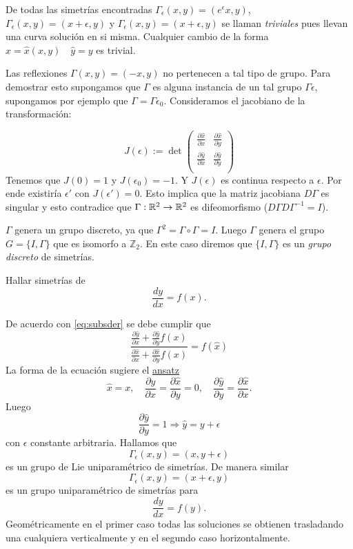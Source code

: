  De todas las simetrías encontradas $\Gamma_{\epsilon}(x,y)=(e^{\epsilon}x,y)$, $\Gamma_{\epsilon}(x,y)=(x+\epsilon,y)$ y  $\Gamma_{\epsilon}(x,y)=(x+\epsilon,y)$ se llaman \emph{triviales} pues llevan una curva solución en si misma.  Cualquier cambio de la forma $\hat{x}=\hat{x}(x,y)\quad \hat{y}=y$ es trivial.  


 Las reflexiones $\Gamma(x,y)=(-x,y)$  no pertenecen a tal tipo de  grupo. Para demostrar esto supongamos que  $\Gamma$ es alguna instancia de un tal grupo $\Gamma{\epsilon}$, supongamos por ejemplo que $\Gamma=\Gamma{\epsilon_0}$.  Consideramos el jacobiano de la transformación:

\[J(\epsilon):=\det\begin{pmatrix} \frac{\partial\hat{x}}{\partial x}&  \frac{\partial\hat{x}}{\partial y}\\
 \frac{\partial\hat{y}}{\partial x} &  \frac{\partial\hat{y}}{\partial y}\\
\end{pmatrix}
\]
 Tenemos que $J(0)=1$ y $J(\epsilon_0)=-1$. Y $J(\epsilon)$ es continua respecto a $\epsilon$. Por ende existiría $\epsilon'$ con $J(\epsilon')=0$. Esto implica que la matriz jacobiana $D\Gamma$ es singular y esto contradice que $\Gamma:\mathbb{R}^2\to \mathbb{R}^2$ es difeomorfismo ($D\Gamma D\Gamma^{-1}=I$).



 $\Gamma$  genera un grupo discreto, ya que $\Gamma^2=\Gamma\circ \Gamma=I$. Luego $\Gamma$ genera el grupo $G=\{I,\Gamma\}$ que es isomorfo a $\mathbb{Z}_2$. En este caso diremos que    $\{I,\Gamma\}$ es un \emph{grupo discreto} de simetrías.




 \begin{ejemplo} Hallar simetrías de
\[\frac{dy}{dx}=f(x).\]
\end{ejemplo}
De acuerdo con \eqref{eq:subsder} se debe cumplir que
 \[\frac{\frac{\partial\hat{y}}{\partial x}+\frac{\partial\hat{y}}{\partial y}f(x)}{\frac{\partial\hat{x}}{\partial x}+\frac{\partial\hat{x}}{\partial y}f(x)}=f(\hat{x})\]
La forma de la ecuación sugiere el  \href{http://es.wikipedia.org/wiki/Ansatz}{ansatz}
   \[\boxed{\hat{x}=x},\quad \frac{\partial\hat{y}}{\partial x}=\frac{\partial\hat{x}}{\partial y}=0,\quad
   \frac{\partial\hat{y}}{\partial y}=\frac{\partial\hat{x}}{\partial x}. \]
 Luego 
\[\frac{\partial\hat{y}}{\partial y}=1\Rightarrow \boxed{\hat{y}=y+\epsilon} \]
con $\epsilon$ constante arbitraria. Hallamos que
\[\Gamma_{\epsilon}(x,y)=(x,y+\epsilon)\]
es un grupo de Lie uniparamétrico de simetrías. De manera similar
\[\Gamma_{\epsilon}(x,y)=(x+\epsilon,y)\]
es un grupo uniparamétrico de simetrías para 
\[\frac{dy}{dx}=f(y).\]
Geométricamente en el primer caso todas las soluciones se obtienen trasladando una cualquiera verticalmente y en el segundo caso horizontalmente.



